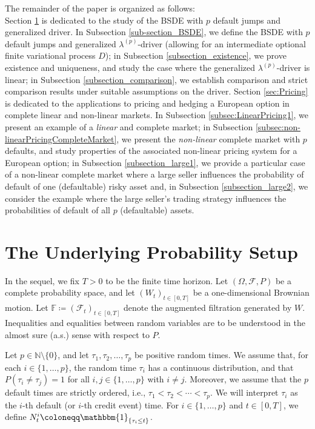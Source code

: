 \documentclass[11pt,a4paper]{article}
\numberwithin{equation}{section}
\theoremstyle{newPlain}
\theoremstyle{newDefinition}
\theoremstyle{newRemark}
\begin{document}
The remainder of the paper is organized as follows: \\
Section \ref{sec:PPS} is dedicated to the study of the BSDE with $p$  default jumps and generalized driver. 
In Subsection \ref{sub-section_BSDE}, we define the BSDE with $p$  default jumps and generalized  $\lambda^{(p)}$-driver  (allowing for an intermediate optional finite variational process $D$);  in Subsection \ref{subsection_existence}, we prove existence and uniqueness, and study the case where the generalized  $\lambda^{(p)}$-driver is linear; in   Subsection \ref{subsection_comparison}, we establish comparison and  strict comparison results under  suitable assumptions on the driver. Section \ref{sec:Pricing} is dedicated to the applications to pricing and hedging a European option in complete linear and non-linear markets. In Subsection \ref{subsec:LinearPricing1}, we present an example of  a \textit{linear} and complete market; in Subsection \ref{subsec:non-linearPricingCompleteMarket}, we present the\textit{ non-linear } complete market with $p$ defaults, and study properties of the associated non-linear pricing system for a European option; in Subsection \ref{subsection_large1}, we provide a  particular case of a  non-linear complete market where a large seller influences  the probability of default of one (defaultable) risky asset and, in Subsection \ref{subsection_large2}, we  consider the example where the large seller's trading strategy influences the probabilities of default of all $p$  (defaultable) assets. 
\section{The Underlying Probability Setup}\label{sec:PPS}
In the sequel, we fix $T > 0$ to be the finite time horizon. Let $(\Omega, \mathcal{F}, P)$ be a complete probability space, and let $(W_t)_{t \in [0, T]}$ be a one-dimensional Brownian motion. Let $\mathbb{F} \coloneqq (\mathcal{F}_t)_{t \in [0, T]}$ denote the augmented filtration generated by $W$. Inequalities and equalities between random variables are to be understood in the almost sure (a.s.) sense with respect to $P$. 

Let $p \in \mathbb{N} \setminus \{0\}$, and let $\tau_1, \tau_2, \ldots, \tau_p$ be positive random times. We assume that, for each $i \in \{1, \ldots, p\}$, the random time $\tau_i$ has a continuous distribution, and that $P(\tau_i \ne \tau_j) = 1$ for all $i, j \in \{1, \ldots, p\}$ with $i \ne j$. Moreover, we assume that the $p$ default times are strictly ordered, i.e., $\tau_1 < \tau_2 < \cdots < \tau_p$. We will interpret  $\tau_i$  as the $i$-th default (or $i$-th credit event) time. For  $i \in \{1, \ldots, p\}$ and $t \in [0, T]$, we define $N_t^i \coloneqq \mathbbm{1}_{\{\tau_i \le t\}}$.
\end{document}
